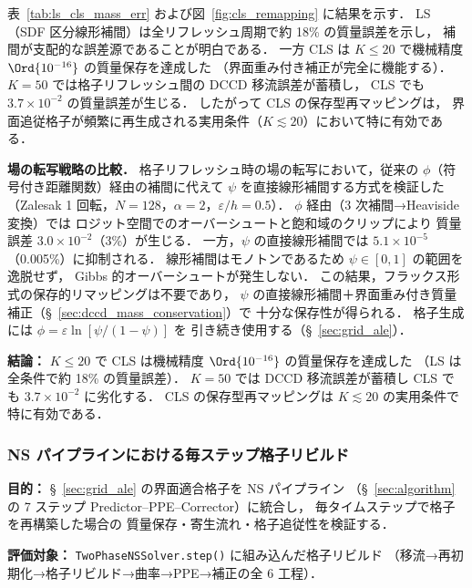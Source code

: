 表~\ref{tab:ls_cls_mass_err} および図~\ref{fig:cls_remapping} に結果を示す．
LS（SDF 区分線形補間）は全リフレッシュ周期で約 18\% の質量誤差を示し，
補間が支配的な誤差源であることが明白である．
一方 CLS は $K \leq 20$ で機械精度 $\Ord{10^{-16}}$ の質量保存を達成した
（界面重み付き補正が完全に機能する）．
$K = 50$ では格子リフレッシュ間の DCCD 移流誤差が蓄積し，
CLS でも $3.7 \times 10^{-2}$ の質量誤差が生じる．
したがって CLS の保存型再マッピングは，
界面追従格子が頻繁に再生成される実用条件（$K \lesssim 20$）において特に有効である．

\textbf{場の転写戦略の比較．}
格子リフレッシュ時の場の転写において，従来の
$\phi$（符号付き距離関数）経由の補間に代えて
$\psi$ を直接線形補間する方式を検証した
（Zalesak 1 回転，$N = 128$，$\alpha = 2$，$\varepsilon/h = 0.5$）．
$\phi$ 経由（3 次補間→Heaviside 変換）では
ロジット空間でのオーバーシュートと飽和域のクリップにより
質量誤差 $3.0 \times 10^{-2}$（3\%）が生じる．
一方，$\psi$ の直接線形補間では $5.1 \times 10^{-5}$（0.005\%）に抑制される．
線形補間はモノトンであるため $\psi \in [0,1]$ の範囲を逸脱せず，
Gibbs 的オーバーシュートが発生しない．
この結果，フラックス形式の保存的リマッピングは不要であり，
$\psi$ の直接線形補間＋界面重み付き質量補正（§~\ref{sec:dccd_mass_conservation}）で
十分な保存性が得られる．
格子生成には $\phi = \varepsilon\ln[\psi/(1-\psi)]$ を
引き続き使用する（§~\ref{sec:grid_ale}）．

\noindent\textbf{結論：}
$K \leq 20$ で CLS は機械精度 $\Ord{10^{-16}}$ の質量保存を達成した
（LS は全条件で約 18\% の質量誤差）．
$K = 50$ では DCCD 移流誤差が蓄積し CLS でも $3.7 \times 10^{-2}$ に劣化する．
CLS の保存型再マッピングは $K \lesssim 20$ の実用条件で特に有効である．


\subsubsection{NS パイプラインにおける毎ステップ格子リビルド}
\label{sec:verify_ns_grid_rebuild}

\noindent\textbf{目的：}
§~\ref{sec:grid_ale} の界面適合格子を NS パイプライン
（§~\ref{sec:algorithm} の 7 ステップ Predictor--PPE--Corrector）に統合し，
毎タイムステップで格子を再構築した場合の
質量保存・寄生流れ・格子追従性を検証する．

\noindent\textbf{評価対象：}
\texttt{TwoPhaseNSSolver.step()} に組み込んだ格子リビルド
（移流→再初期化→格子リビルド→曲率→PPE→補正の全 6 工程）．

